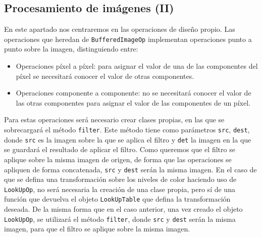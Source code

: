 \subsection{Procesamiento de imágenes (II)}
En este apartado nos centraremos en las operaciones de diseño propio. Las operaciones que heredan de \texttt{BufferedImageOp} implementan operaciones punto a punto sobre la imagen, distinguiendo entre:
\begin{itemize}
\item{Operaciones píxel a píxel: para asignar el valor de una de las componentes del píxel se necesitará conocer el valor de otras componentes.}
\item{Operaciones componente a componente: no se necesitará conocer el valor de las otras componentes para asignar el valor de las componentes de un píxel.}
\end{itemize}
Para estas operaciones será necesario crear clases propias, en las que se sobrecargará el método \texttt{filter}. Este método tiene como parámetros \texttt{src}, \texttt{dest}, donde \texttt{src} es la imagen sobre la que se aplica el filtro y \texttt{det} la imagen en la que se guardará el resultado de aplicar el filtro.
\vskip0.3cm
Como queremos que el filtro se aplique sobre la misma imagen de origen, de forma que las operaciones se apliquen de forma concatenada, \texttt{src} y \texttt{dest} serán la misma imagen.
\vskip0.3cm
En el caso de que se defina una transformación sobre los niveles de color haciendo uso de \texttt{LookUpOp}, no será necesaria la creación de una clase propia, pero sí de una función que devuelva el objeto \texttt{LookUpTable} que defina la transformación deseada.
\vskip0.3cm
De la misma forma que en el caso anterior, una vez creado el objeto \texttt{LookUpOp}, se utilizará el método \texttt{filter}, donde \texttt{src} y \texttt{dest} serán la misma imagen, para que el filtro se aplique sobre la misma imagen. 
